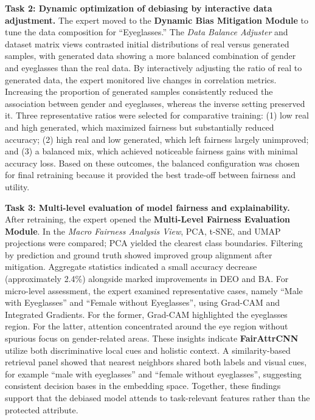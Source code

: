 \documentclass[sigconf]{acmart}
\begin{document}
\textbf{Task 2: Dynamic optimization of debiasing by interactive data adjustment.}
The expert moved to the \textbf{Dynamic Bias Mitigation Module} to tune the data composition for ``Eyeglasses.'' The \textit{Data Balance Adjuster} and dataset matrix views contrasted initial distributions of real versus generated samples, with generated data showing a more balanced combination of gender and eyeglasses than the real data. By interactively adjusting the ratio of real to generated data, the expert monitored live changes in correlation metrics. Increasing the proportion of generated samples consistently reduced the association between gender and eyeglasses, whereas the inverse setting preserved it. Three representative ratios were selected for comparative training: (1) low real and high generated, which maximized fairness but substantially reduced accuracy; (2) high real and low generated, which left fairness largely unimproved; and (3) a balanced mix, which achieved noticeable fairness gains with minimal accuracy loss. Based on these outcomes, the balanced configuration was chosen for final retraining because it provided the best trade-off between fairness and utility.

\textbf{Task 3: Multi-level evaluation of model fairness and explainability.}
After retraining, the expert opened the \textbf{Multi-Level Fairness Evaluation Module}. In the \textit{Macro Fairness Analysis View}, PCA, t-SNE, and UMAP projections were compared; PCA yielded the clearest class boundaries. Filtering by prediction and ground truth showed improved group alignment after mitigation. Aggregate statistics indicated a small accuracy decrease (approximately 2.4\%) alongside marked improvements in DEO and BA. For micro-level assessment, the expert examined representative cases, namely ``Male with Eyeglasses'' and ``Female without Eyeglasses'', using Grad-CAM and Integrated Gradients. For the former, Grad-CAM highlighted the eyeglasses region. For the latter, attention concentrated around the eye region without spurious focus on gender-related areas. These insights indicate \textbf{FairAttrCNN} utilize both discriminative local cues and holistic context. A similarity-based retrieval panel showed that nearest neighbors shared both labels and visual cues, for example ``male with eyeglasses'' and ``female without eyeglasses'', suggesting consistent decision bases in the embedding space. Together, these findings support that the debiased model attends to task-relevant features rather than the protected attribute.
\end{document}
